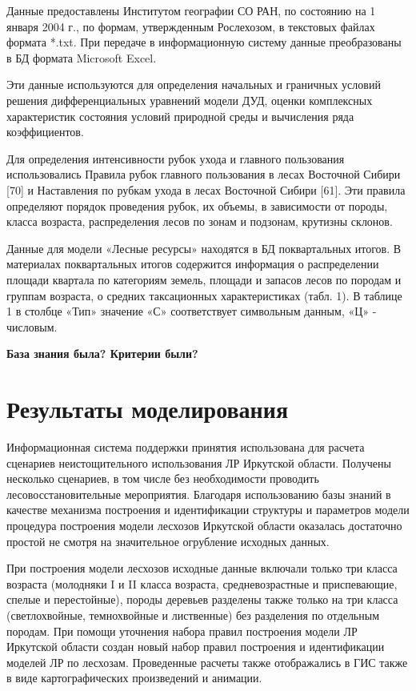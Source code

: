 Данные предоставлены Институтом географии СО РАН, по состоянию на 1 января 2004 г., по формам, утвержденным Рослехозом, в текстовых файлах формата *.txt. При передаче в информационную систему данные преобразованы в БД формата Microsoft Excel.

Эти данные используются для определения начальных и граничных условий решения дифференциальных уравнений модели ДУД, оценки комплексных характеристик состояния условий природной среды и вычисления ряда коэффициентов.

Для определения интенсивности рубок ухода и главного пользования использовались Правила рубок главного пользования в лесах Восточной Сибири [70] и Наставления по рубкам ухода в лесах Восточной Сибири [61]. Эти правила определяют порядок проведения рубок, их объемы, в зависимости от породы, класса возраста, распределения лесов по зонам и подзонам, крутизны склонов.

Данные для модели «Лесные ресурсы» находятся в БД поквартальных итогов. В материалах поквартальных итогов содержится информация о распределении площади квартала по категориям земель, площади и запасов лесов по породам и группам возраста, о средних таксационных характеристиках (табл. 1). В таблице 1 в столбце «Тип» значение «С» соответствует символьным данным, «Ц» - числовым.

{ \bf База знания была? Критерии были?}

\section{Результаты моделирования}

Информационная система поддержки принятия использована для расчета сценариев неистощительного использования ЛР Иркутской области. Получены несколько сценариев, в том числе без необходимости проводить лесовосстановительные мероприятия. Благодаря использованию базы знаний в качестве механизма построения и идентификации структуры и параметров модели процедура построения модели лесхозов Иркутской области оказалась достаточно простой не смотря на значительное огрубление исходных данных.

При построения модели лесхозов исходные данные включали только три класса возраста (молодняки I и II класса возраста, средневозрастные и приспевающие, спелые и перестойные), породы деревьев разделены также только на три класса (светлохвойные, темнохвойные и лиственные) без разделения по отдельным породам. При помощи уточнения набора правил построения модели ЛР Иркутской области создан новый набор правил построения и идентификации моделей ЛР по лесхозам. Проведенные расчеты также отображались в ГИС также в виде картографических произведений и анимации.

